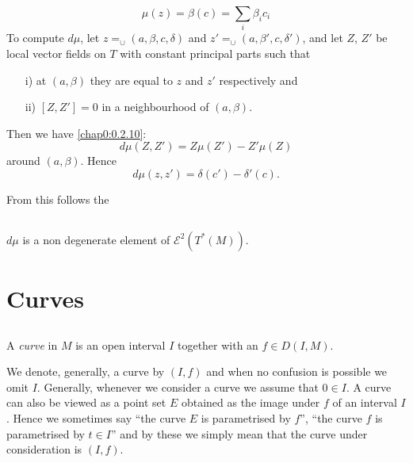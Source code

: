 \begin{equation*}
\mu(z)=\beta(c)=\sum_{i}\beta_{i}c_{i}\tag{0.4.25}\label{chap0:0.4.25}
\end{equation*}
To \pageoriginale compute $d\mu$, let
$z{\displaystyle{\mathop{=}_{\cup}}}(a,\beta,c,\delta)$ and
$z'{\displaystyle{\mathop{=}_{\cup}}}(a,\beta',c,\delta')$, and let
$Z$, $Z'$ be local vector fields on $T$ with constant principal parts
such that
\begin{itemize}
\item[i)] at $(a,\beta)$ they are equal to $z$ and $z'$ respectively
and

\item[ii)] $[Z,Z']=0$ in a neighbourhood of $(a,\beta)$.
\end{itemize}

Then we have \eqref{chap0:0.2.10}:
$$
d\mu (Z,Z')=Z\mu(Z')-Z'\mu(Z)
$$
around $(a,\beta)$. Hence
\begin{equation*}
d\mu(z,z')=\delta(c')-\delta'(c).\tag{0.4.26}\label{chap0:0.4.26}
\end{equation*}

From this follows the

\setcounter{subsection}{26}
\subsection{}\label{chap0:0.4.27}


\begin{lemma*}
$d\mu$ is a non degenerate element of $\mathscr{E}^{2}(T^{\ast}(M))$.
\end{lemma*}

\section{Curves}\label{chap0:sec5}

\subsection{}\label{chap0:0.5.1}

\begin{defi*}
A {\em curve} in $M$ is an open interval $I$ together with an $f\in D(I,M)$.
\end{defi*}

We denote, generally, a curve by $(I,f)$ and when no confusion is
possible we omit $I$. Generally, whenever we consider a curve we
assume that $0\in I$. A curve can also be viewed as a point set $E$
obtained as the image under $f$ of an interval $I$. Hence we sometimes
say ``the curve $E$ is parametrised by $f$'', ``the curve $f$ is
parametrised by $t\in I$'' and by these we simply mean that the curve
under consideration is $(I,f)$.

